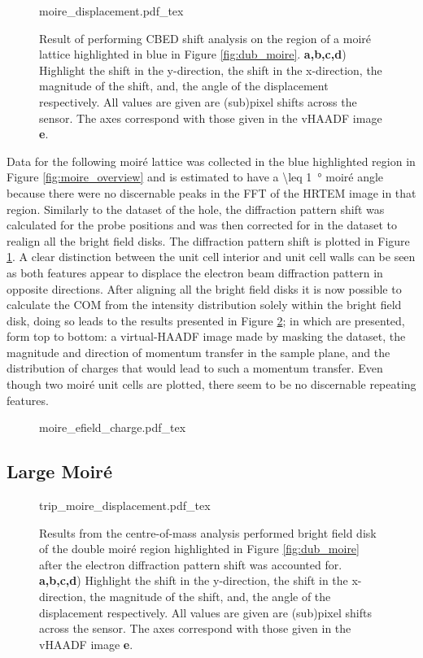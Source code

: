 \begin{figure}
    \centering
    \def\svgwidth{.95\linewidth}
    {moire_displacement.pdf_tex}
    \caption{Result of performing CBED shift analysis on the region of a moiré lattice highlighted in blue in Figure \ref{fig:dub_moire}. \textbf{a,b,c,d}) Highlight the shift in the y-direction, the shift in the x-direction, the magnitude of the shift, and, the angle of the displacement respectively. All values are given are (sub)pixel shifts across the sensor. The axes correspond with those given in the vHAADF image \textbf{e}.}
    \label{fig:m_dis}
\end{figure}

Data for the following moiré lattice was collected in the blue highlighted region in Figure \ref{fig:moire_overview} and is estimated to have a \SI{\leq 1}{\degree} moiré angle because there were no discernable peaks in the FFT of the HRTEM image in that region. Similarly to the dataset of the hole, the diffraction pattern shift was calculated for the probe positions and was then corrected for in the dataset to realign all the bright field disks. The diffraction pattern shift is plotted in Figure \ref{fig:m_dis}. A clear distinction between the unit cell interior and unit cell walls can be seen as both features appear to displace the electron beam diffraction pattern in opposite directions. After aligning all the bright field disks it is now possible to calculate the COM from the intensity distribution solely within the bright field disk, doing so leads to the results presented in Figure \ref{fig:m_mom}; in which are presented, form top to bottom: a virtual-HAADF image made by masking the dataset, the magnitude and direction of momentum transfer in the sample plane, and the distribution of charges that would lead to such a momentum transfer. Even though two moiré unit cells are plotted, there seem to be no discernable repeating features.

\begin{figure}
    \centering
    \def\svgwidth{.5\linewidth}
    {moire_efield_charge.pdf_tex}
    \caption{}
    \label{fig:m_mom}
\end{figure}

\subsection{Large Moiré}

\begin{figure}
    \centering
    \def\svgwidth{.95\linewidth}
    {trip_moire_displacement.pdf_tex}
    \caption{Results from the centre-of-mass analysis performed bright field disk of the double moiré region highlighted in Figure \ref{fig:dub_moire} after the electron diffraction pattern shift was accounted for. \textbf{a,b,c,d}) Highlight the shift in the y-direction, the shift in the x-direction, the magnitude of the shift, and, the angle of the displacement respectively. All values are given are (sub)pixel shifts across the sensor. The axes correspond with those given in the vHAADF image \textbf{e}.}
    \label{fig:trip_m_dis}
\end{figure}

